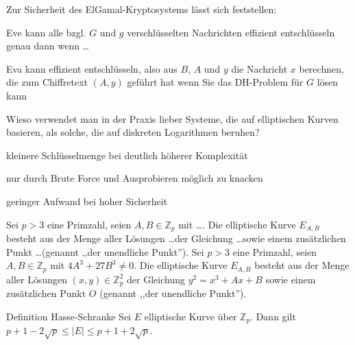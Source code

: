\documentclass[avery5371, frame]{flashcards}
\begin{document}
\begin{flashcard}{Zur Sicherheit des ElGamal-Kryptosystems lässt sich feststellen:

        Eve kann alle bzgl. $G$ und $g$ verschlüsselten Nachrichten effizient entschlüsseln genau dann wenn \dots}
    Eva kann effizient entschlüsseln, also aus $B$, $A$ und $y$ die Nachricht $x$ berechnen, die zum Chiffretext $(A,y)$ geführt hat wenn Sie das DH-Problem für $G$ lösen kann
\end{flashcard}

\begin{flashcard}{Wieso verwendet man in der Praxis lieber Systeme, die auf elliptischen Kurven basieren, als solche, die auf diskreten Logarithmen beruhen?}
    \begin{itemize*}
        \item kleinere Schlüsselmenge bei deutlich höherer Komplexität
        \item nur durch Brute Force und Ausprobieren möglich zu knacken
        \item geringer Aufwand bei hoher Sicherheit
    \end{itemize*}
\end{flashcard}

\begin{flashcard}{Sei $p >3$ eine Primzahl, seien $A,B\in\mathbb{Z}_p$ mit \dots. Die elliptische Kurve $E_{A,B}$ besteht aus der Menge aller Lösungen \dots der Gleichung \dots sowie einem zusätzlichen Punkt \dots (genannt ,,der unendliche Punkt'').}
    Sei $p >3$ eine Primzahl, seien $A,B\in\mathbb{Z}_p$ mit $4A^3+ 27B^3 \not= 0$. Die elliptische Kurve $E_{A,B}$ besteht aus der Menge aller Lösungen $(x,y)\in\mathbb{Z}^2_p$ der Gleichung $y^2=x^3+Ax+B$ sowie einem zusätzlichen Punkt $O$ (genannt ,,der unendliche Punkt'').
\end{flashcard}

\begin{flashcard}{Definition Hasse-Schranke}
    Sei $E$ elliptische Kurve über $\mathbb{Z}_p$. Dann gilt $p+ 1- 2\sqrt{p}\leq |E|\leq p+1 + 2\sqrt{p}$.
\end{flashcard}
\end{document}
